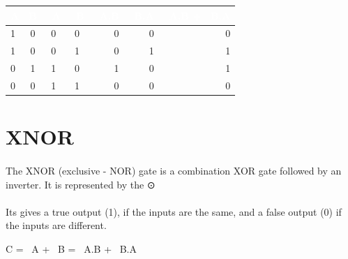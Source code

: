 \documentclass{article}
\begin{document}
\begin{table}[h!]
	\begin{center}
		\begin{tabular}{ |l|c|c|c|r|r|r| }
			\cellcolor{blue!100}\textcolor{white}{\textbf{    A    }} & 
			\cellcolor{blue!100}\textcolor{white}{\textbf{    B    }} & \cellcolor{blue!100}\textcolor{white}{\textbf{~A}} &
			\cellcolor{blue!100}\textcolor{white}{\textbf{~B}} &
			\cellcolor{blue!100}\textcolor{white}{\textbf{~A.B}} &
			\cellcolor{blue!100}\textcolor{white}{\textbf{~B.A}} &
			\cellcolor{blue!100}\textcolor{white}{\textbf{~A.B + ~B.A}}\\
			\hline
			1 & 0 & 0 & 0 & 0 & 0 & 0\\
			1 & 0 & 0 & 1 & 0 & 1 & 1\\
			0 & 1 & 1 & 0 & 1 & 0 & 1\\
			0 & 0 & 1 & 1 & 0 & 0 & 0\\
			\hline
			
		\end{tabular}
	\end{center}
\end{table}
\newpage
\section{XNOR}
\paragraph{}
The XNOR (exclusive - NOR) gate is a combination XOR gate followed by an inverter. It is represented by the ⊙
\paragraph{}
Its gives a  true output (1), if the inputs are the same, and a false output (0) if the inputs are different. 
\begin{center}
	C = ~A + ~B = ~A.B + ~B.A
\end{center}
\end{document}
